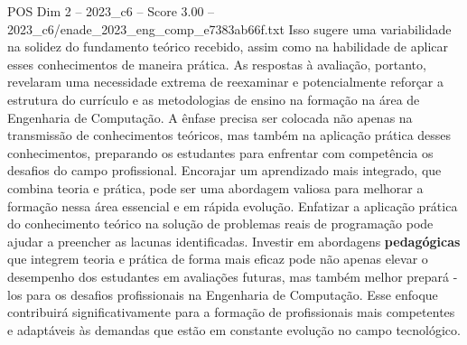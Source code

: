 \begin{textsample}{POS Dim 2 – 2023\_c6 – Score 3.00 – 2023\_c6/enade\_2023\_eng\_comp\_e7383ab66f.txt}
Isso sugere uma variabilidade na solidez do fundamento teórico recebido, assim como na habilidade de aplicar esses conhecimentos de maneira prática.
As respostas à avaliação, portanto, revelaram uma necessidade extrema de reexaminar e potencialmente reforçar a estrutura do currículo e as metodologias de ensino na formação na área de Engenharia de Computação.
A ênfase precisa ser colocada não apenas na transmissão de conhecimentos teóricos, mas também na aplicação prática desses conhecimentos, preparando os estudantes para enfrentar com competência os desafios do campo profissional.
Encorajar um aprendizado mais integrado, que combina teoria e prática, pode ser uma abordagem valiosa para melhorar a formação nessa área essencial e em rápida evolução.
Enfatizar a aplicação prática do conhecimento teórico na solução de problemas reais de programação pode ajudar a preencher as lacunas identificadas.
Investir em abordagens \textbf{pedagógicas} que integrem teoria e prática de forma mais eficaz pode não apenas elevar o desempenho dos estudantes em avaliações futuras, mas também melhor prepará -los para os desafios profissionais na Engenharia de Computação.
Esse enfoque contribuirá significativamente para a formação de profissionais mais competentes e adaptáveis às demandas que estão em constante evolução no campo tecnológico.

\end{textsample}
